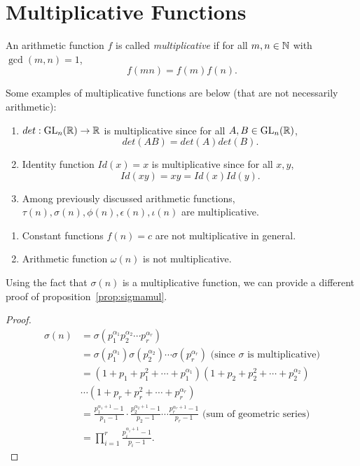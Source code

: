 \section{Multiplicative Functions}
\begin{definition}
    An arithmetic function $f$ is called \textit{multiplicative} if for all $m, n \in \mathbb{N}$ with $\gcd(m, n) = 1$, \[f(mn) = f(m)f(n).\]
\end{definition}
Some examples of multiplicative functions are below (that are not necessarily arithmetic):

\begin{eg}
    \begin{enumerate}
        \item $det: \operatorname{GL}_n(\mathbb{R}) \to \mathbb{R}$ is multiplicative since for all $A, B \in \operatorname{GL}_n(\mathbb{R})$, \[det(AB) = det(A)det(B).\]
        \item Identity function $Id(x) = x$ is multiplicative since for all $x, y$, \[Id(xy) = xy = Id(x)Id(y).\]
        \item Among previously discussed arithmetic functions, $\tau(n), \sigma(n), \phi(n), \epsilon(n), \iota(n)$ are multiplicative.
    \end{enumerate}
\end{eg}
\begin{noneg}
    \begin{enumerate}
        \item Constant functions $f(n) = c$ are not multiplicative in general.
        \item Arithmetic function $\omega(n)$ is not multiplicative.
    \end{enumerate}
\end{noneg}

Using the fact that $\sigma(n)$ is a multiplicative function, we can provide a different proof of proposition~\ref{prop:sigmamul}.
\begin{proof}
    \begin{align*}
        \sigma(n) &= \sigma(p_1^{\alpha_1} p_2^{\alpha_2} \cdots p_r^{\alpha_r})\\
        &= \sigma(p_1^{\alpha_1}) \sigma(p_2^{\alpha_2}) \cdots \sigma(p_r^{\alpha_r}) \text{ (since $\sigma$ is multiplicative)}\\
        &= (1 + p_1 + p_1^2 + \cdots + p_1^{\alpha_1})(1 + p_2 + p_2^2 + \cdots + p_2^{\alpha_2}) \\&\cdots (1 + p_r + p_r^2 + \cdots + p_r^{\alpha_r})\\
        &= \frac{p_1^{\alpha_1 + 1} - 1}{p_1 - 1} \cdot \frac{p_2^{\alpha_2 + 1} - 1}{p_2 - 1} \cdots \frac{p_r^{\alpha_r + 1} - 1}{p_r - 1} \text{ (sum of geometric series)}\\
        &= \prod_{i=1}^r \frac{p_i^{\alpha_i + 1} - 1}{p_i - 1}.
    \end{align*}
\end{proof}

